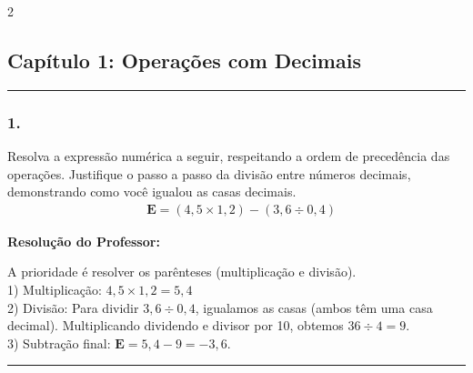\par\vspace{0.3cm} 
\raggedcolumns
\begin{multicols*}{2}
\vspace{0.1cm}

\subsection*{Capítulo 1: Operações com Decimais}
\vspace{-0.2cm}\noindent\rule{\linewidth}{1.5pt} 
\par\vspace{\espacoPosTitulo}
\subsubsection*{1.} Resolva a expressão numérica a seguir, respeitando a ordem de precedência das operações. Justifique o passo a passo da divisão entre números decimais, demonstrando como você igualou as casas decimais.
$$
\begin{aligned}
& \textbf{E} = (4,5 \times 1,2) - \left( 3,6 \div 0,4 \right)
\end{aligned}
$$

\ifgabarito
    \begin{tcolorbox}[colback=CorTitUm!5, colframe=CorTitUm, boxrule=1pt, arc=4pt, left=6pt, right=6pt, top=6pt, bottom=6pt]
    \small\textbf{\textcolor{CorTitUm}{Resolução do Professor:}}\par\vspace{0.1cm}
    \color{CinzaEscuro}
    A prioridade é resolver os parênteses (multiplicação e divisão).\\
    1) Multiplicação: $ 4,5 \times 1,2 = 5,4 $\\
    2) Divisão: Para dividir $ 3,6 \div 0,4 $, igualamos as casas (ambos têm uma casa decimal). Multiplicando dividendo e divisor por 10, obtemos $ 36 \div 4 = 9 $.\\
    3) Subtração final: $ \textbf{E} = 5,4 - 9 = -3,6 $.
    \end{tcolorbox}
\fi

\par\vspace{\espacoQuestao}

\noindent\textcolor{CorLinha}{\rule{\linewidth}{0.5pt}} 
\par\vspace{\espacoPreQuestao}

\end{multicols*}
